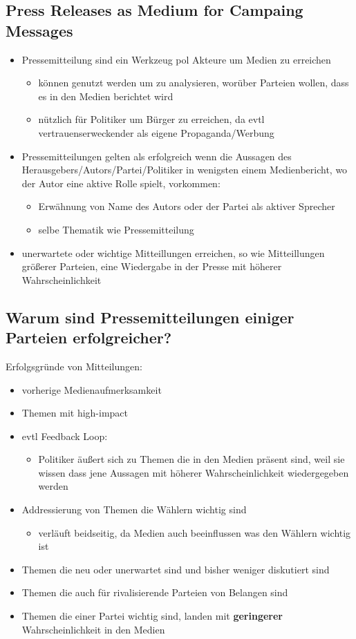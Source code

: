 \documentclass[11pt]{article}
\begin{document}
\subsection{Press Releases as Medium for Campaing Messages}
\label{sec:org30a97cd}
\begin{itemize}
\item Pressemitteilung sind ein Werkzeug pol Akteure um Medien zu erreichen
\begin{itemize}
\item können genutzt werden um zu analysieren, worüber Parteien wollen, dass es in den Medien berichtet wird
\item nützlich für Politiker um Bürger zu erreichen, da evtl vertrauenserweckender als eigene Propaganda/Werbung
\end{itemize}
\item Pressemitteilungen gelten als erfolgreich wenn die Aussagen des Herausgebers/Autors/Partei/Politiker in wenigsten einem Medienbericht, wo der Autor eine aktive Rolle spielt, vorkommen:
\begin{itemize}
\item Erwähnung von Name des Autors oder der Partei als aktiver Sprecher
\item selbe Thematik wie Pressemitteilung
\end{itemize}
\item unerwartete oder wichtige Mitteillungen erreichen, so wie Mitteillungen größerer Parteien, eine Wiedergabe in der Presse mit höherer Wahrscheinlichkeit
\end{itemize}

\subsection{Warum sind Pressemitteilungen einiger Parteien erfolgreicher?}
\label{sec:org4ff4953}
Erfolgsgründe von Mitteilungen:
\begin{itemize}
\item vorherige Medienaufmerksamkeit
\item Themen mit high-impact
\item evtl Feedback Loop:
\begin{itemize}
\item Politiker äußert sich zu Themen die in den Medien präsent sind, weil sie wissen dass jene Aussagen mit höherer Wahrscheinlichkeit wiedergegeben werden
\end{itemize}
\item Addressierung von Themen die Wählern wichtig sind
\begin{itemize}
\item verläuft beidseitig, da Medien auch beeinflussen was den Wählern wichtig ist
\end{itemize}
\item Themen die neu oder unerwartet sind und bisher weniger diskutiert sind
\item Themen die auch für rivalisierende Parteien von Belangen sind
\item Themen die einer Partei wichtig sind, landen mit \textbf{geringerer} Wahrscheinlichkeit in den Medien
\end{itemize}
\end{document}
